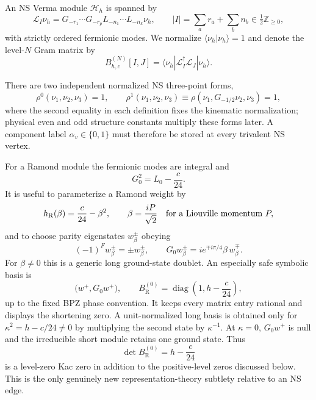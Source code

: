 \documentclass[11pt]{article}
\newcommand{\R}{\mathrm{R}}
\newcommand{\half}{\tfrac12}
\begin{document}
An NS Verma module $\mathcal H_h$ is spanned by
\begin{equation}
 \mathcal L_I\nu_h
 =G_{-r_1}\cdots G_{-r_p}L_{-n_1}\cdots L_{-n_k}\nu_h,
 \qquad |I|=\sum_a r_a+\sum_b n_b\in\half\mathbb Z_{\ge0},
 \label{eq:descendants}
\end{equation}
with strictly ordered fermionic modes.  We normalize
$\langle\nu_h|\nu_h\rangle=1$ and denote the level-$N$ Gram matrix by
\begin{equation}
 B^{(N)}_{h,c}[I,J]
 =\langle\nu_h|\mathcal L_I^\dagger\mathcal L_J|\nu_h\rangle .
 \label{eq:gram}
\end{equation}

There are two independent normalized NS three-point forms,
\begin{equation}
 \rho^0(\nu_1,\nu_2,\nu_3)=1,
 \qquad
 \rho^1(\nu_1,\nu_2,\nu_3)
 \equiv\rho(\nu_1,G_{-1/2}\nu_2,\nu_3)=1,
 \label{eq:rho-components}
\end{equation}
where the second equality in each definition fixes the kinematic
normalization; physical even and odd structure constants multiply these
forms later.  A component label $\alpha_v\in\{0,1\}$ must therefore be stored
at every trivalent NS vertex.

For a Ramond module the fermionic modes are integral and
\begin{equation}
 G_0^2=L_0-\frac{c}{24}.
 \label{eq:r-g0-square}
\end{equation}
It is useful to parameterize a Ramond weight by
\begin{equation}
 h_{\R}(\beta)=\frac{c}{24}-\beta^2,
 \qquad
 \beta=\frac{iP}{\sqrt2}
 \quad\hbox{for a Liouville momentum }P,
 \label{eq:r-beta}
\end{equation}
and to choose parity eigenstates $w_\beta^\pm$ obeying
\begin{equation}
 (-1)^F w_\beta^\pm=\pm w_\beta^\pm,
 \qquad
 G_0w_\beta^\pm=i e^{\mp i\pi/4}\beta\,w_\beta^\mp.
 \label{eq:r-ground-action}
\end{equation}
For $\beta\ne0$ this is a generic long ground-state doublet.  An especially
safe symbolic basis is
\begin{equation}
 \bigl(w^+,G_0w^+\bigr),
 \qquad B_{\R}^{(0)}=\operatorname{diag}
 \left(1,h-\frac{c}{24}\right),
 \label{eq:r-unnormalized-basis}
\end{equation}
up to the fixed BPZ phase convention.  It keeps every matrix entry rational
and displays the shortening zero.  A unit-normalized long basis is obtained
only for $\kappa^2=h-c/24\ne0$ by multiplying the second state by
$\kappa^{-1}$.  At $\kappa=0$, $G_0w^+$ is null and the irreducible short
module retains one ground state.  Thus
\begin{equation}
 \det B_{\R}^{(0)}=h-\frac{c}{24}
 \label{eq:r-shortening-zero}
\end{equation}
is a level-zero Kac zero in addition to the positive-level zeros discussed
below.  This is the only genuinely new representation-theory subtlety
relative to an NS edge.
\end{document}
